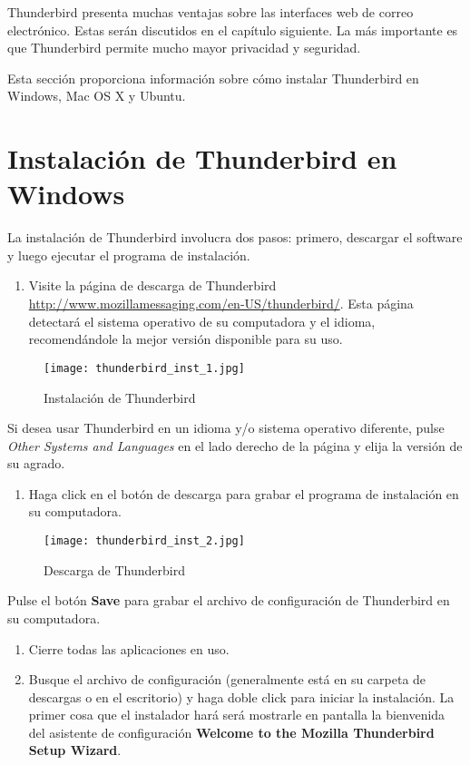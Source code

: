 \documentclass[10pt,a5paper,twoside,,]{book}
\providecommand{\tightlist}{%
  \setlength{\itemsep}{0pt}\setlength{\parskip}{0pt}}
\begin{document}
Thunderbird presenta muchas ventajas sobre las interfaces web de correo
electrónico. Estas serán discutidos en el capítulo siguiente. La más
importante es que Thunderbird permite mucho mayor privacidad y
seguridad.

Esta sección proporciona información sobre cómo instalar Thunderbird en
Windows, Mac OS X y Ubuntu.

\section{Instalación de Thunderbird en
Windows}\label{instalaciuxf3n-de-thunderbird-en-windows}

La instalación de Thunderbird involucra dos pasos: primero, descargar el
software y luego ejecutar el programa de instalación.

\begin{enumerate}
\def\labelenumi{\arabic{enumi}.}
\tightlist
\item
  Visite la página de descarga de Thunderbird
  \url{http://www.mozillamessaging.com/en-US/thunderbird/}. Esta página
  detectará el sistema operativo de su computadora y el idioma,
  recomendándole la mejor versión disponible para su uso.
\end{enumerate}

\begin{figure}[htbp]
\centering
\texttt{[image: thunderbird\_inst\_1.jpg]}
\caption{Instalación de Thunderbird}
\end{figure}

Si desea usar Thunderbird en un idioma y/o sistema operativo diferente,
pulse \emph{Other Systems and Languages} en el lado derecho de la página
y elija la versión de su agrado.

\begin{enumerate}
\def\labelenumi{\arabic{enumi}.}
\setcounter{enumi}{1}
\tightlist
\item
  Haga click en el botón de descarga para grabar el programa de
  instalación en su computadora.
\end{enumerate}

\begin{figure}[htbp]
\centering
\texttt{[image: thunderbird\_inst\_2.jpg]}
\caption{Descarga de Thunderbird}
\end{figure}

Pulse el botón \textbf{Save} para grabar el archivo de configuración de
Thunderbird en su computadora.

\begin{enumerate}
\def\labelenumi{\arabic{enumi}.}
\setcounter{enumi}{2}
\tightlist
\item
  Cierre todas las aplicaciones en uso.
\item
  Busque el archivo de configuración (generalmente está en su carpeta de
  descargas o en el escritorio) y haga doble click para iniciar la
  instalación. La primer cosa que el instalador hará será mostrarle en
  pantalla la bienvenida del asistente de configuración \textbf{Welcome
  to the Mozilla Thunderbird Setup Wizard}.
\end{enumerate}
\end{document}
